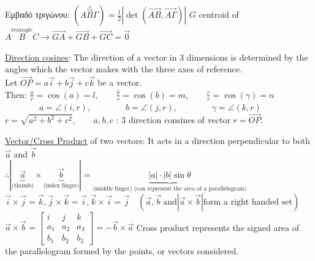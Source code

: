 \documentclass[12pt]{article}
\begin{document}
\begin{flushleft}
	\textbullet \quad \textgreek{Εμβαδό τριγώνου:} $\displaystyle  (A\overset{\triangle}{B}\Gamma) = \frac{1}{2} \left|\det\left(\vec{AB}, \vec{A\Gamma}\right) \right| $ \linebreak 
		\textbullet \quad $G$ centroid of $A\overset{triangle}{B}C \rightarrow \vec{GA} + \vec{GB} + \vec{GC} = \vec{0} $ \linebreak 
	
	\textbullet \quad \uline{Direction cosines}: The direction of a vector in 3 dimensions is determined by the angles which the vector makes with the three axes of reference. \\ Let $\displaystyle \overrightarrow{OP} = a\vec{i} + b\vec{j} + c\vec{k} $ be a vector. \\ 
	Then: $\displaystyle \frac{a}{r} = \cos (a) = l, \qquad \frac{b}{r} = \cos (b) = m, \qquad \frac{c}{r} = \cos (\gamma) = n $\\
			 $\displaystyle \qquad \qquad a = \angle(i, r), \qquad \qquad  b = \angle(j, r), \qquad \qquad \gamma = \angle(k, r) $ \\ 
	$ r= \sqrt{a^2 +b^2 +c^2}, \qquad a, b, c $  :  3 direction consines of vector $ r = \overrightarrow{OP}$.  \linebreak 
	
	\textbullet \quad  \uline{Vector/Cross Product} of two vectors: It acts in a direction perpendicular to both $ \vec{a}$ and $ \vec{b} $ \\ $\displaystyle  \therefore \left| \underbrace{\vec{a}}_{\text{(thumb)}} \times \underbrace{\vec{b}}_{\text{(index finger)}} \right| = \underbrace{|a|\cdot |b| \sin \theta}_{\text{(middle finger)  (can represent the area  of a parallelogram)}}$ \linebreak 
	$ \vec{i} \times \vec{j} = \vec{k} , \vec{j} \times \vec{k} = \vec{i}, \vec{k} \times \vec{i} = \vec{j} \quad (\vec{a}, \vec{b}\ \text{and} \left| \vec{a} \times \vec{b} \right| \text{form a right handed set}) $ \linebreak 
	$\displaystyle \vec{a} \times \vec{b} = \begin{bmatrix}
			i & j & k \\ 
			a_1 & a_2 & a_3 \\ 
			b_1 & b_2 & b_3	
	\end{bmatrix} = - \vec{b} \times \vec{a} $ \linebreak 
	Cross product represents the signed area of the parallelogram formed by the points, or vectors considered. \linebreak 
	

\end{flushleft}
\end{document}

